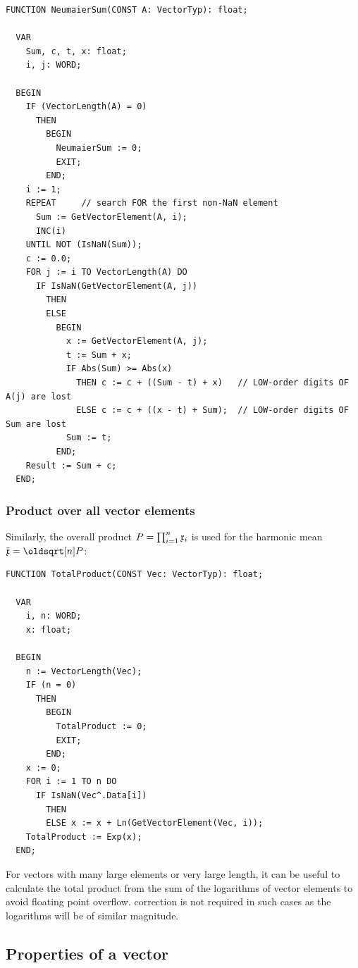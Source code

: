 \begin{refsection}
\begin{lstlisting}[caption=Compensated summation]
  FUNCTION NeumaierSum(CONST A: VectorTyp): float;

  VAR
    Sum, c, t, x: float;
    i, j: WORD;

  BEGIN
    IF (VectorLength(A) = 0)
      THEN
        BEGIN
          NeumaierSum := 0;
          EXIT;
        END;
    i := 1;
    REPEAT     // search FOR the first non-NaN element
      Sum := GetVectorElement(A, i);
      INC(i)
    UNTIL NOT (IsNaN(Sum));
    c := 0.0;
    FOR j := i TO VectorLength(A) DO
      IF IsNaN(GetVectorElement(A, j))
        THEN
        ELSE
          BEGIN
            x := GetVectorElement(A, j);
            t := Sum + x;
            IF Abs(Sum) >= Abs(x)
              THEN c := c + ((Sum - t) + x)   // LOW-order digits OF A(j) are lost
              ELSE c := c + ((x - t) + Sum);  // LOW-order digits OF Sum are lost
            Sum := t;
          END;
    Result := Sum + c;
  END;
\end{lstlisting}

\subsubsection{Product over all vector elements}

Similarly, the overall product \(P = \prod_{i=1}^n{\mathfrak{x}_i} \) is used for the harmonic mean \(\tilde{\AbsVec{x}} = \sqrt[n]{P} \):

\begin{lstlisting}[caption=Product of all vector elements]
  FUNCTION TotalProduct(CONST Vec: VectorTyp): float;

  VAR
    i, n: WORD;
    x: float;

  BEGIN
    n := VectorLength(Vec);
    IF (n = 0)
      THEN
        BEGIN
          TotalProduct := 0;
          EXIT;
        END;
    x := 0;
    FOR i := 1 TO n DO
      IF IsNaN(Vec^.Data[i])
        THEN
        ELSE x := x + Ln(GetVectorElement(Vec, i));
    TotalProduct := Exp(x);
  END;
\end{lstlisting}
For vectors with many large elements or very large length, it can be useful to calculate the total product from the sum of the logarithms of vector elements to avoid floating point overflow.  correction is not required in such cases as the logarithms will be of similar magnitude.

\subsection{Properties of a vector}


\end{refsection}
